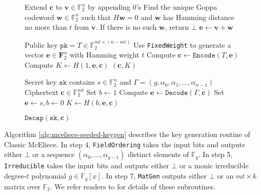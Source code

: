 \documentclass[runningheads]{llncs}
\newcommand{\pk}{\texttt{pk}}
\newcommand{\sk}{\texttt{sk}}
\newcommand{\wt}{\mathop{wt}}
\begin{document}
\begin{figure}[hp]
\begin{algorithm}[H]
\begin{algorithmic}[1]
        \State Extend $\mathbf{c}$ to $\mathbf{v} \in\mathbb{F}_2^n$ by appending 0's 
        \State Find the unique Goppa codeword $\mathbf{w}\in\mathbb{F}_2^n$ such that $H\mathbf{w} = 0$ and $\mathbf{w}$ has Hamming distance no more than $t$ from $\mathbf{v}$. If there is no such $\mathbf{w}$, return $\bot$
        \State \Return  $\mathbf{e} \leftarrow \mathbf{v} + \mathbf{w}$
    \end{algorithmic}
\end{algorithm}
\vspace{-4em}
\begin{algorithm}[H]
    \caption{$\texttt{Encap}(\pk)$}\label{alg:mceliece-encap}
    \begin{algorithmic}[1]
        \Require Public key $\pk = T\in\mathbb{F}_2^{mt \times (n - mt)}$
        \State Use \texttt{FixedWeight} to generate a vector $\mathbf{e} \in \mathbf{F}_2^n$ with Hamming weight $t$
        \State Compute $\mathbf{c} \leftarrow \texttt{Encode}(T, \mathbf{e})$
        \State Compute $K \leftarrow H(1, \mathbf{e}, \mathbf{c})$
        \State \Return $(\mathbf{c}, K)$
    \end{algorithmic}
\end{algorithm}
\vspace{-4em}
\begin{algorithm}[H]
    \caption{$\texttt{Decap}(\sk, \mathbf{c})$}\label{alg:mceliece-decap}
    \begin{algorithmic}[1]
        \Require Secret key $\sk$ contains $s \in \mathbb{F}_2^n$ and $\Gamma = (g, \alpha_0, \alpha_1, \ldots, \alpha_{n-1})$
        \Require Ciphertext $\mathbf{c} \in \mathbb{F}_2^{mt}$
        \State Set $b \leftarrow 1$
        \State Compute $\mathbf{e} \leftarrow \texttt{Decode}(\Gamma, \mathbf{c})$
        \If{$\wt(\mathbf{e})\neq t \lor H\mathbf{e}\neq\mathbf{c}$}
            \State Set $\mathbf{e} \leftarrow s, b \leftarrow 0$
        \EndIf
        \State \Return $K \leftarrow H(b, \mathbf{e}, \mathbf{c})$
    \end{algorithmic}
\end{algorithm}
\end{figure}

Algorithm \ref{alg:mceliece-seeded-keygen} describes the key generation routine of Classic McEliece. In step 4, \texttt{FieldOrdering} takes the input bits and outputs either $\bot$ or a sequence $(\alpha_0, \ldots, \alpha_{q-1})$ distinct elements of $\mathbb{F}_q$. In step 5, \texttt{Irreducible}  takes the input bits and outputs either $\bot$ or a monic irreducible degree-$t$ polynomial $g \in \mathbb{F}_q[x]$. In step 7, \texttt{MatGen} outputs either $\bot$ or an $mt \times k$ matrix over $\mathbb{F}_2$. We refer readers to \cite{ClassicMcEliece2022} for details of these subroutines.
\end{document}
